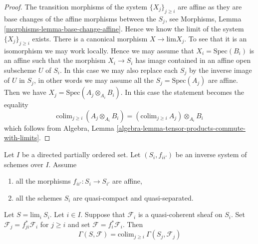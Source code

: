 \begin{proof}
The transition morphisms of the system $\{X_j\}_{j \geq i}$ are
affine as they are base changes of the affine morphisms between
the $S_j$, see Morphisms, Lemma \ref{morphisms-lemma-base-change-affine}.
Hence we know the limit of the system $\{X_j\}_{j \geq i}$
exists. There is a canonical morphism $X \to \text{lim} X_j$.
To see that it is an isomorphism we may work locally.
Hence we may assume that $X_i = \text{Spec}(B_i)$ is an affine such that
the morphism $X_i \to S_i$ has image contained in an affine open
subscheme $U$ of $S_i$. In this case we may also replace each $S_j$
by the inverse image of $U$ in $S_j$, in other words we may assume
all the $S_j = \text{Spec}(A_j)$ are affine. Then we have
$X_j = \text{Spec}(A_j \otimes_{A_i} B_i)$. In this case the statement
becomes the equality
$$
\text{colim}_{j \geq i}\ (A_j \otimes_{A_i} B_i) =
(\text{colim}_{j \geq i}\ A_j) \otimes_{A_i} B_i
$$
which follows from
Algebra, Lemma \ref{algebra-lemma-tensor-products-commute-with-limits}.
\end{proof}


\begin{lemma}
\label{lemma-descend-section}
Let $I$ be a directed partially ordered set.
Let $(S_i, f_{ii'})$ be an inverse system of schemes over $I$.
Assume
\begin{enumerate}
\item all the morphisms $f_{ii'} : S_i \to S_{i'}$ are affine,
\item all the schemes $S_i$ are quasi-compact and quasi-separated.
\end{enumerate}
Let $S = \text{lim}_i\ S_i$. Let $i \in I$.
Suppose that $\mathcal{F}_i$ is a quasi-coherent sheaf on $S_i$.
Set $\mathcal{F}_j = f_{ji}^*\mathcal{F}_i$ for $j \geq i$ and set
$\mathcal{F} = f_i^*\mathcal{F}_i$.
Then
$$
\Gamma(S, \mathcal{F}) = \text{colim}_{j \geq i}\ \Gamma(S_j, \mathcal{F}_j)
$$
\end{lemma}


